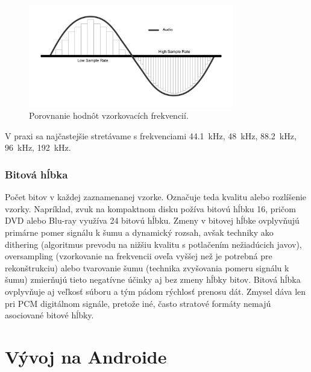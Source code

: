 \begin{figure}[hbt]
	\centering
	\includegraphics[width=0.8\textwidth]{obrazky-figures/sampling-comparison.png}
	\caption[Porovnanie kvality audia pri rôznych hodnotách vzorkovacej frekvencie.]%
    {Porovnanie hodnôt vzorkovacích frekvencií\protect\footnotemark.}
	\label{sampling-comparison}
\end{figure}





V praxi sa najčastejšie stretávame s frekvenciami 44.1~kHz, 48~kHz, 88.2~kHz, 96~kHz, 192~kHz. 


\subsection*{Bitová hĺbka}
Počet bitov v každej zaznamenanej vzorke. Označuje teda kvalitu alebo rozlíšenie vzorky. Napríklad, zvuk na kompaktnom disku požíva bitovú hĺbku 16, pričom DVD alebo Blu-ray využíva 24 bitovú hĺbku. Zmeny v bitovej hĺbke ovplyvňujú primárne pomer signálu k šumu a dynamický rozsah, avšak techniky ako dithering (algoritmus prevodu na nižšiu kvalitu s potlačením nežiadúcich javov), oversampling (vzorkovanie na frekvencii oveľa vyššej než je potrebná pre rekonštrukciu) alebo tvarovanie šumu (technika zvyšovania pomeru signálu k šumu) zmierňujú tieto negatívne účinky aj bez zmeny hĺbky bitov. Bitová hĺbka ovplyvňuje aj veľkosť súboru a tým pádom rýchlosť prenosu dát. Zmysel dáva len pri PCM digitálnom signále, pretože iné, často stratové formáty nemajú asociované bitové hĺbky. 
	


\chapter{Vývoj na Androide}
\label{development_android}

